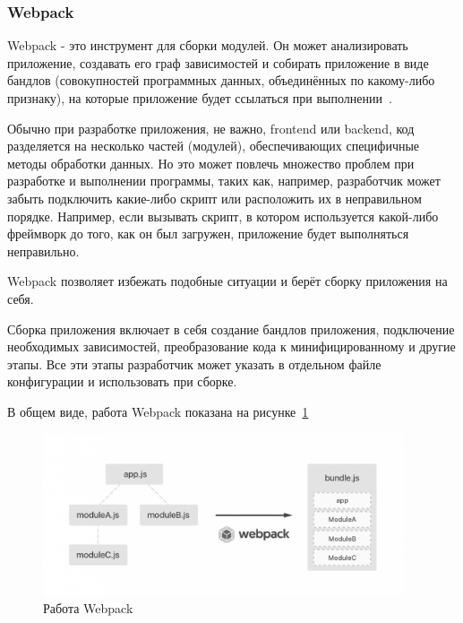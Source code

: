 \subsubsection{Webpack}
Webpack - это инструмент для сборки модулей. Он может анализировать приложение, создавать его граф зависимостей и собирать приложение в виде бандлов (совокупностей программных данных, объединённых по какому-либо признаку), на которые приложение будет ссылаться при выполнении~\cite{Webpack}.

Обычно при разработке приложения, не важно, frontend или backend, код разделяется на несколько частей (модулей), обеспечивающих специфичные методы обработки данных. Но это может повлечь множество проблем при разработке и выполнении программы, таких как, например, разработчик может забыть подключить какие-либо скрипт или расположить их в неправильном порядке. Например, если вызывать скрипт, в котором используется какой-либо фреймворк до того, как он был загружен, приложение будет выполняться неправильно.

Webpack позволяет избежать подобные ситуации и берёт сборку приложения на себя.

Сборка приложения включает в себя создание бандлов приложения, подключение необходимых зависимостей, преобразование кода к минифицированному и другие этапы. Все эти этапы разработчик может указать в отдельном файле конфигурации и использовать при сборке.

В общем виде, работа Webpack показана на рисунке~\ref{img:webpack}

\begin{figure}[H]
  \centering
  \includegraphics[width=0.95\textwidth]{assets/images/theoretical/webpack.jpg}
  \caption{Работа Webpack}
  \label{img:webpack}
\end{figure}